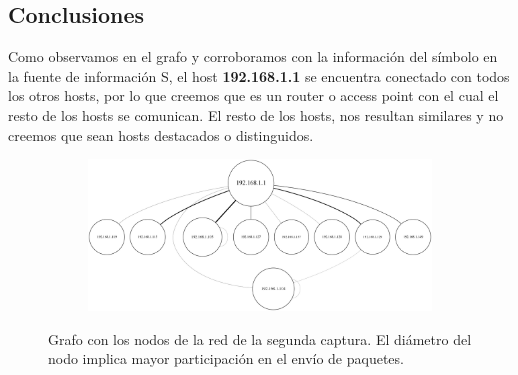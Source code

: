 \subsection{Conclusiones}

\par Como observamos en el grafo y corroboramos con la información del símbolo en la fuente de información S, el host \textbf{192.168.1.1} se encuentra conectado con todos los otros hosts, por lo que creemos que es un router o access point con el cual el resto de los hosts se comunican. El resto de los hosts, nos resultan similares y no creemos que sean hosts destacados o distinguidos.

\begin{figure}[ht]
  \hspace*{-0.5cm}
  \begin{subfigure}{1.1\textwidth}
    \includegraphics[width=\textwidth]{imagenes/hogarenia/grafo.png}
  \end{subfigure}
	\label{fig:exp2_hogar_grafo}
	\caption{Grafo con los nodos de la red de la segunda captura. El diámetro del nodo implica mayor participación en el envío de paquetes.}
\end{figure}
